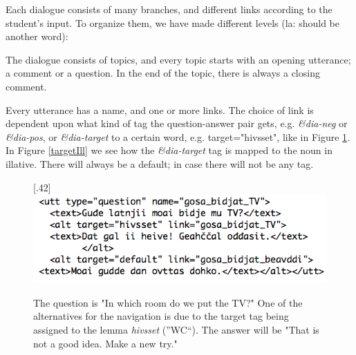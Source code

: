 \documentclass[11pt]{article}
\begin{document}
%	

Each dialogue consists of many branches, and different links according to the student's input. To organize them, we have made different levels (la: should be another word):


The dialogue consists of topics, and every topic starts with an opening utterance; a comment or a question. In the end of the topic, there is always a closing comment.  

Every utterance has a name, and one or more links. The choice of link is dependent upon what kind of tag the question-answer pair gets, e.g. \textit{\&dia-neg} or \textit{\&dia-pos}, or \textit{\&dia-target} to a certain word, e.g. target="hivsset", like in Figure \ref{TV}.  In Figure \ref{targetIll} we see how the \textit{\&dia-target} tag is mapped to the noun in illative. There will always be a default; in case there will not be any tag. \\

\begin{figure}[htbp]
\begin{center}
\scalebox{.40}[.42]{\includegraphics{presentation/img/gosabidjatTV2.png}}
\caption{The question is "In which room do we put the TV?" One of the alternatives for the navigation is due to the target tag being assigned to the lemma \textit{hivsset} (''WC``). The answer will be "That is not a good idea. Make a new try."}
\label{TV}
\end{center}
\end{figure}
\end{document}

